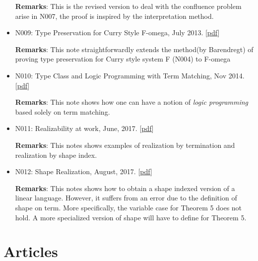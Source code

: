 \documentclass[10pt]{article}
\begin{document}
\begin{itemize}
\noindent \textbf{Remarks}: This is the revised version to deal with the confluence problem arise in N007, the proof is inspired by the interpretation method. 

\item N009: Type Preservation for Curry Style F-omega, July 2013. [\href{../../document/notes/fomega-presv.pdf}{pdf}]

\noindent \textbf{Remarks}: This note straightforwardly extends the method(by Barendregt) of proving type preservation for Curry style system F (N004) to F-omega

\item N010: Type Class and Logic Programming with Term Matching, Nov 2014. [\href{../../document/notes/tm.pdf}{pdf}]

\noindent \textbf{Remarks}: This note shows how one can have a notion of \textit{logic programming} based solely on term matching. 

\item N011: Realizability at work,  June, 2017. [\href{../../document/notes/realization.pdf}{pdf}]

  \noindent \textbf{Remarks}: This notes shows examples of realization by termination and realization by shape index. 

\item N012: Shape Realization,  August, 2017. [\href{../../document/notes/shape-real.pdf}{pdf}]

  \noindent \textbf{Remarks}: This notes shows how to obtain a shape indexed version of a linear language. However, it suffers from an error due to the definition of shape on term. More specifically, the variable case for Theorem 5 does not hold. A more specialized version of shape will
  have to define for Theorem 5. 
  

  
\end{itemize}

\section*{Articles}
\end{document}
